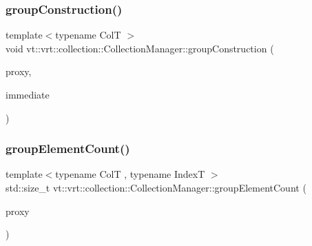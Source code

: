 \subsubsection{\texorpdfstring{group\+Construction()}{groupConstruction()}}
{\footnotesize\ttfamily template$<$typename ColT $>$ \\
void vt\+::vrt\+::collection\+::\+Collection\+Manager\+::group\+Construction (\begin{DoxyParamCaption}\item[{\hyperlink{namespacevt_a1b417dd5d684f045bb58a0ede70045ac}{Virtual\+Proxy\+Type} const \&}]{proxy,  }\item[{bool}]{immediate }\end{DoxyParamCaption})\hspace{0.3cm}{\ttfamily [static]}}

\mbox{\label{structvt_1_1vrt_1_1collection_1_1_collection_manager_a93b0cf22a65db97cd5816c01191b9d8d}} 
\subsubsection{\texorpdfstring{group\+Element\+Count()}{groupElementCount()}}
{\footnotesize\ttfamily template$<$typename ColT , typename IndexT $>$ \\
std\+::size\+\_\+t vt\+::vrt\+::collection\+::\+Collection\+Manager\+::group\+Element\+Count (\begin{DoxyParamCaption}\item[{\hyperlink{namespacevt_a1b417dd5d684f045bb58a0ede70045ac}{Virtual\+Proxy\+Type} const \&}]{proxy }\end{DoxyParamCaption})}

\mbox{\label{structvt_1_1vrt_1_1collection_1_1_collection_manager_ad94808d98e429e50376a9d1b35de57ee}} 
